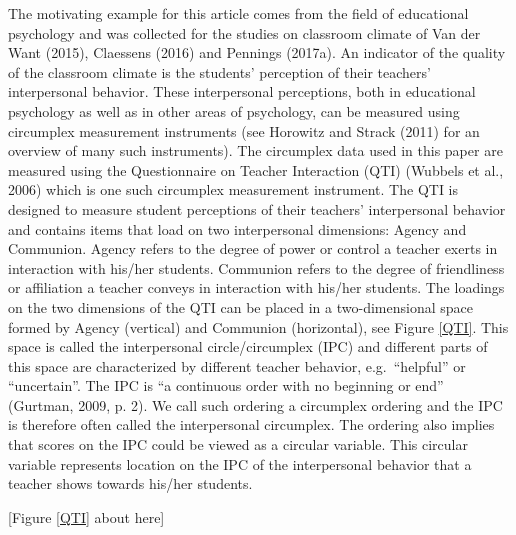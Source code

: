 \documentclass[man,mask]{apa6}
\DeclareRobustCommand{\VANDER}[3]{#2}
\begin{document}
The motivating example for this article comes from the field of educational
psychology and was collected for the studies on classroom climate of
\VANDER{Want}{Van der}{van der} Want (2015), Claessens (2016) and Pennings (2017a). An
indicator of the quality of the classroom climate is the students' perception of
their teachers' interpersonal behavior. These interpersonal perceptions, both in
educational psychology as well as in other areas of psychology, can be measured
using circumplex measurement instruments (see Horowitz and Strack (2011) for an
overview of many such instruments).\newline
\indent The circumplex data used in this paper are measured using the
Questionnaire on Teacher Interaction (QTI) (Wubbels et al., 2006) which is
one such circumplex measurement instrument. The QTI is designed to measure
student perceptions of their teachers' interpersonal behavior and contains items
that load on two interpersonal dimensions: Agency and Communion. Agency refers
to the degree of power or control a teacher exerts in interaction with his/her
students. Communion refers to the degree of friendliness or affiliation a
teacher conveys in interaction with his/her students. The loadings on the two
dimensions of the QTI can be placed in a two-dimensional space formed by Agency
(vertical) and Communion (horizontal), see Figure \ref{QTI}. This space is
called the interpersonal circle/circumplex (IPC) and different parts of this
space are characterized by different teacher behavior, e.g.~\enquote{helpful} or
\enquote{uncertain}. The IPC is ``a continuous order with no beginning or end''
(Gurtman, 2009, p. 2). We call such ordering a circumplex ordering and
the IPC is therefore often called the interpersonal circumplex. The ordering
also implies that scores on the IPC could be viewed as a circular variable. This
circular variable represents location on the IPC of the interpersonal behavior
that a teacher shows towards his/her students.

\hfil [Figure \ref{QTI} about here] \hfil
\end{document}

